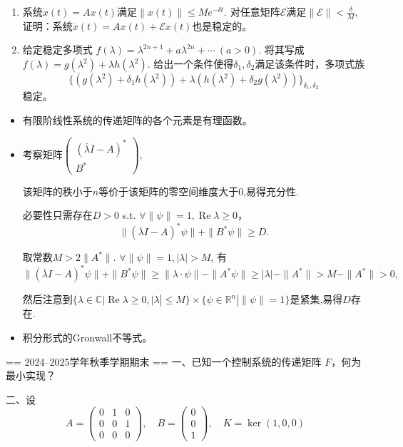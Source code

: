 \begin{enumerate}
\item[六、]系统$\dot{x}(t)=Ax(t)$满足$\|x(t)\|\le Me^{-\delta t}$.
对任意矩阵$\mathcal{E}$满足$\|\mathcal{E}\|<\frac{\delta}{M}$,
证明：系统$\dot{x}(t)=Ax(t)+\mathcal{E} x(t)$也是稳定的。



\item[七、]给定稳定多项式
\(f(\lambda)=\lambda^{2n+1}+a\lambda^{2n}+\cdots\ (a>0).\)
将其写成$f(\lambda)=g(\lambda^2)+\lambda h(\lambda^2).$
给出一个条件使得$\delta_1,\delta_2$满足该条件时，多项式族
\[\{(g(\lambda^2)+\delta_1h(\lambda^2))+\lambda (h(\lambda^2)+\delta_2g(\lambda^2))\}_{\delta_1,\delta_2}\]
稳定。

\end{enumerate}
\begin{proofc}[提示]
    \begin{itemize}
    \item[三、]有限阶线性系统的传递矩阵的各个元素是有理函数。

    \item[五、]考察矩阵$\begin{pmatrix}
(\bar{\lambda} I-A)^*\\
B^*
\end{pmatrix}$,

该矩阵的秩小于$n$等价于该矩阵的零空间维度大于$0$,易得充分性.

必要性只需存在$D>0$ s.t. $\forall \|\psi\|=1,\operatorname{Re} \lambda\geq 0$，
\[\|(\bar{\lambda} I-A)^*\psi\|+\|B^*\psi\|\geq D.\]

取常数$M>2\|A^*\|$. $\forall \|\psi\|=1, |\lambda|>M$, 有
\[\|(\bar{\lambda} I-A)^*\psi\|+\|B^*\psi\|\geq 
\|\lambda \cdot\psi\|-\|A^*\psi\|\geq|\lambda|-\|A^*\|>M-\|A^*\|>0,\]

然后注意到$\{\lambda\in \mathbb{C}|\operatorname{Re}\lambda\geq 0,|\lambda|\leq M\}\times \{\psi\in \mathbb{R}^{n}| \|\psi\|=1\}$是紧集,易得$D$存在.

\item[六、]积分形式的Gronwall不等式。\qedhere

\end{itemize}
\end{proofc}



== 2024--2025学年秋季学期期末 ==
一、已知一个控制系统的传递矩阵 \( F \)，何为最小实现？

二、设  
\[A = \begin{pmatrix} 0 & 1 & 0 \\ 0 & 0 & 1 \\ 0 & 0 & 0 \end{pmatrix}, \quad B = \begin{pmatrix} 0 \\ 0 \\ 1 \end{pmatrix}, \quad K = \ker(1, 0, 0)\]

